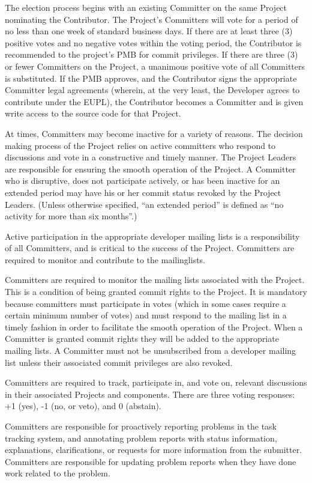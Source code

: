 The election process begins with an existing Committer on the same
Project nominating the Contributor. The Project's Committers will vote
for a period of no less than one week of standard business days. If
there are at least three (3) positive votes and no negative votes within
the voting period, the Contributor is recommended to the project's PMB
for commit privileges. If there are three (3) or fewer Committers on the
Project, a unanimous positive vote of all Committers is substituted. If
the PMB approves, and the Contributor signs the appropriate Committer
legal agreements (wherein, at the very least, the Developer agrees to
contribute under the EUPL), the Contributor becomes a Committer and is
given write access to the source code for that Project.

At times, Committers may become inactive for a variety of reasons. The
decision making process of the Project relies on active committers who
respond to discussions and vote in a constructive and timely manner. The
Project Leaders are responsible for ensuring the smooth operation of the
Project. A Committer who is disruptive, does not participate actively,
or has been inactive for an extended period may have his or her commit
status revoked by the Project Leaders. (Unless otherwise specified, ``an
extended period'' is defined as ``no activity for more than six
months''.)

Active participation in the appropriate developer mailing lists is a
responsibility of all Committers, and is critical to the success of the
Project. Committers are required to monitor and contribute to the
mailinglists.

Committers are required to monitor the mailing lists associated with the
Project. This is a condition of being granted commit rights to the
Project. It is mandatory because committers must participate in votes
(which in some cases require a certain minimum number of votes) and must
respond to the mailing list in a timely fashion in order to facilitate
the smooth operation of the Project. When a Committer is granted commit
rights they will be added to the appropriate mailing lists. A Committer
must not be unsubscribed from a developer mailing list unless their
associated commit privileges are also revoked.

Committers are required to track, participate in, and vote on, relevant
discussions in their associated Projects and components. There are three
voting responses: +1 (yes), -1 (no, or veto), and 0 (abstain).

Committers are responsible for proactively reporting problems in the
task tracking system, and annotating problem reports with status
information, explanations, clarifications, or requests for more
information from the submitter. Committers are responsible for updating
problem reports when they have done work related to the problem.

